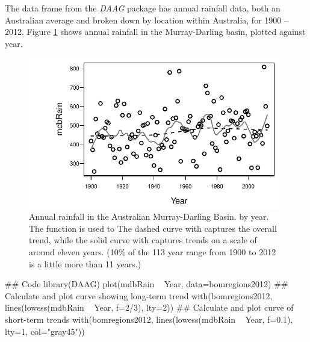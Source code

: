 The data frame  from the {\em DAAG} package has
annual rainfall data, both an Australian average and broken down by
location within Australia, for 1900 -- 2012.
Figure \ref{fig:mdbRain} shows annual rainfall in the Murray-Darling
basin, plotted against year.

\begin{figure}
\begin{Schunk}


\centerline{\includegraphics[width=0.98\textwidth]{figs/03-MDBrainfall-1} }

\end{Schunk}
\caption{Annual rainfall in the Australian Murray-Darling Basin.
by year.  The  function is used to
The dashed curve with  captures the
overall trend, while the solid curve with 
captures trends on a scale of around eleven years. (10\% of the 113 year
range from 1900 to 2012 is a little more than 11 years.)\label{fig:mdbRain}}
\vspace*{-6pt}
\end{figure}

\begin{fullwidth}

\begin{Schunk}
\begin{Sinput}
## Code
library(DAAG)
plot(mdbRain ~ Year, data=bomregions2012)
## Calculate and plot curve showing long-term trend
with(bomregions2012, lines(lowess(mdbRain ~ Year, f=2/3), lty=2))
## Calculate and plot curve of short-term trends
with(bomregions2012, lines(lowess(mdbRain ~ Year, f=0.1),
                           lty=1, col="gray45"))
\end{Sinput}
\end{Schunk}

\end{fullwidth}

